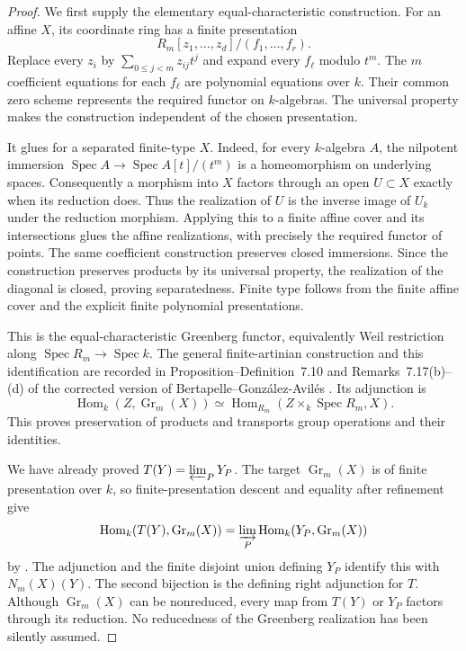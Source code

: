 \begin{proof}
We first supply the elementary equal-characteristic construction.
For an affine $X$, its coordinate ring has a finite presentation
\[
 R_m[z_1,\ldots,z_d]/(f_1,\ldots,f_r).
\]
Replace every $z_i$ by $\sum_{0\leq j<m}z_{ij}t^j$ and expand every
$f_\ell$ modulo $t^m$.  The $m$ coefficient equations for each
$f_\ell$ are polynomial equations over $k$.  Their common zero scheme
represents the required functor on $k$-algebras.  The universal property
makes the construction independent of the chosen presentation.

It glues for a separated finite-type $X$.  Indeed, for every $k$-algebra
$A$, the nilpotent immersion
$\operatorname{Spec}A\to\operatorname{Spec}A[t]/(t^m)$ is a
homeomorphism on underlying spaces.  Consequently a morphism into $X$
factors through an open $U\subset X$ exactly when its reduction does.
Thus the realization of $U$ is the inverse image of $U_k$ under the
reduction morphism.  Applying this to a finite affine cover and its
intersections glues the affine realizations, with precisely the required
functor of points.  The same coefficient construction preserves closed
immersions.  Since the construction preserves products by its universal
property, the realization of the diagonal is closed, proving separatedness.
Finite type follows from the finite affine cover and the explicit finite
polynomial presentations.

This is the equal-characteristic Greenberg functor, equivalently Weil
restriction along $\operatorname{Spec}R_m\to\operatorname{Spec}k$.
The general finite-artinian construction and this identification are
recorded in Proposition--Definition~7.10 and Remarks~7.17(b)--(d) of the
corrected version of Bertapelle--Gonz\'alez-Avil\'es
\cite[pp.~50--54, especially (7.19)]{BBertapelleGonzalezAviles2022}.
Its adjunction is
\[
 \operatorname{Hom}_k(Z,\operatorname{Gr}_m(X))
 \simeq\operatorname{Hom}_{R_m}(Z\times_k\operatorname{Spec}R_m,X).
\]
This proves preservation of products and transports group operations
and their identities.

We have already proved $T(Y)=\varprojlim_PY_P$.  The target
$\operatorname{Gr}_m(X)$ is of finite presentation over $k$, so
finite-presentation descent and equality after refinement give
\[
 \operatorname{Hom}_k(T(Y),\operatorname{Gr}_m(X))
 =\varinjlim_P\operatorname{Hom}_k(Y_P,\operatorname{Gr}_m(X))
\]
by \cite[Lemma~32.10.1(2)--(3), tag 01ZM]{BStacks}.
The adjunction and the finite disjoint union defining $Y_P$ identify
this with $N_m(X)(Y)$.  The second bijection is the defining right
adjunction for $T$.  Although $\operatorname{Gr}_m(X)$ can be
nonreduced, every map from $T(Y)$ or $Y_P$ factors through its
reduction.  No reducedness of the Greenberg realization has been
silently assumed.
\end{proof}

